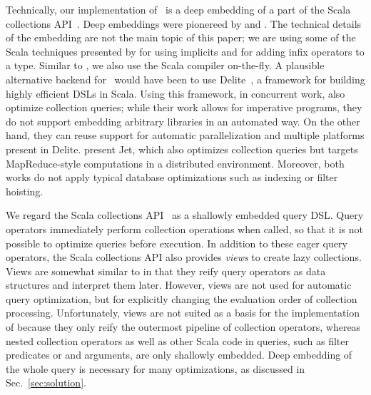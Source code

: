 

\label{sec:rwdsl}
Technically, our implementation of \LoS\ is a deep embedding of a part of the Scala collections API~\citep{odersky2009fighting}.
Deep embeddings were pionereed by \citet{Leijen99DSEC} and \citet{elliott03compiling}. The technical
details of the embedding are not the main topic of this paper; we are using some of the 
Scala techniques presented by \citet{rompf2010lightweight} for using implicits and for
adding infix operators to a type. Similar to \citet{rompf2010lightweight}, we also 
use the Scala compiler on-the-fly. A plausible alternative backend for \LoS\ would
have been to use Delite~\citep{Rompf11BBlocks}, a framework for
building highly efficient DSLs in Scala.
Using this framework, in concurrent work, \citet{Rompf13} also optimize
collection queries; while their work allows for imperative programs, they do
not support embedding arbitrary libraries in an automated way. On the other
hand, they can reuse support for automatic parallelization and multiple platforms present in Delite.
\citet{Ackermann12} present Jet, which also optimizes collection queries but
targets MapReduce-style computations in a distributed environment.
Moreover, both works do not apply typical database optimizations such as
indexing or filter hoisting.


We regard the Scala collections API~\citep{odersky2009fighting} as a shallowly embedded query DSL\@. Query operators immediately perform collection operations when called, so that it is not possible to optimize queries before execution. In addition to these eager query operators, the Scala collections API also provides \emph{views} to create lazy collections.
Views are somewhat similar to {\LoS} in that they reify query operators as data structures and interpret them later.
However, views are not used for automatic query optimization, but for explicitly changing the evaluation order of collection processing. Unfortunately, views are not suited as a basis for the implementation of {\LoS} because they only reify the outermost pipeline of collection operators, whereas nested collection operators as well as other Scala code in queries, such as filter predicates or  and  arguments, are only shallowly embedded.
Deep embedding of the whole query is necessary for many optimizations, as discussed in Sec.~\ref{sec:solution}.

